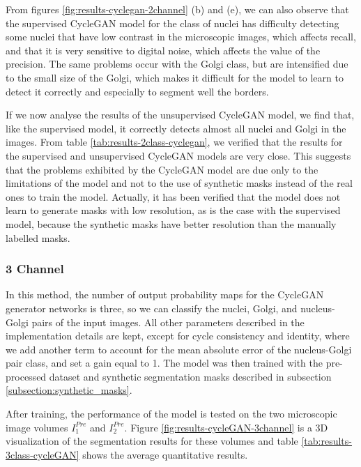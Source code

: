 From figures \ref{fig:results-cyclegan-2channel} (b) and (e), we can also observe that the supervised CycleGAN model for the class of nuclei has difficulty detecting some nuclei that have low contrast in the microscopic images, which affects recall, and that it is very sensitive to digital noise, which affects the value of the precision. The same problems occur with the Golgi class, but are intensified due to the small size of the Golgi, which makes it difficult for the model to learn to detect it correctly and especially to segment well the borders.

If we now analyse the results of the unsupervised CycleGAN model, we find that, like the supervised model, it correctly detects almost all nuclei and Golgi in the images. From table \ref{tab:results-2class-cyclegan}, we verified that the results for the supervised and unsupervised CycleGAN models are very close. This suggests that the problems exhibited by the CycleGAN model are due only to the limitations of the model and not to the use of synthetic masks instead of the real ones to train the model. Actually, it has been verified that the model does not learn to generate masks with low resolution, as is the case with the supervised model, because the synthetic masks have better resolution than the manually labelled masks.


\subsubsection*{3 Channel}

In this method, the number of output probability maps for the CycleGAN generator networks is three, so we can classify the nuclei, Golgi, and nucleus-Golgi pairs of the input images. All other parameters described in the implementation details are kept, except for cycle consistency and identity, where we add another term to account for the mean absolute error of the nucleus-Golgi pair class, and set a gain equal to 1. The model was then trained with the pre-processed dataset and synthetic segmentation masks described in subsection \ref{subsection:synthetic_masks}.

After training, the performance of the model is tested on the two microscopic image volumes $I^{Pre}_1$ and $I^{Pre}_2$. Figure \ref{fig:results-cycleGAN-3channel} is a 3D visualization of the segmentation results for these volumes and table \ref{tab:results-3class-cycleGAN} shows the average quantitative results.

